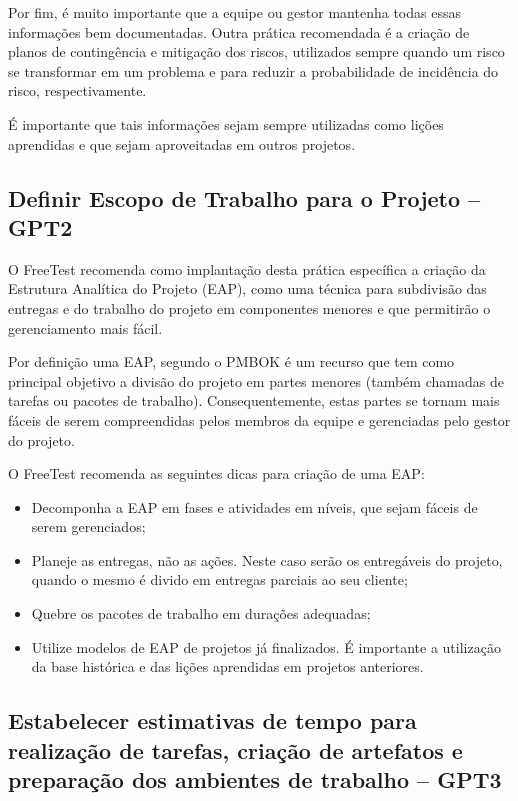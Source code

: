 Por fim, é muito importante que a equipe ou gestor mantenha todas essas informações bem documentadas. Outra prática recomendada é a criação de planos de contingência e mitigação dos riscos, utilizados sempre quando um risco se transformar em um problema e para reduzir a probabilidade de incidência do risco, respectivamente.

É importante que tais informações sejam sempre utilizadas como lições aprendidas e que sejam aproveitadas em outros projetos.

\subsection{Definir Escopo de Trabalho para o Projeto – GPT2}
\label{sec:guiagpt2}

O FreeTest recomenda como implantação desta prática específica a criação da Estrutura Analítica do Projeto (EAP), como uma técnica para subdivisão das entregas e do trabalho do projeto em componentes menores e que permitirão o gerenciamento mais fácil.

Por definição uma EAP, segundo o PMBOK \cite{GuiaPMBOK} é um recurso que tem como principal objetivo a divisão do projeto em partes menores (também chamadas de tarefas ou pacotes de trabalho). Consequentemente, estas partes se tornam mais fáceis de serem compreendidas pelos membros da equipe e gerenciadas pelo gestor do projeto.

O FreeTest recomenda as seguintes dicas para criação de uma EAP:

\begin{itemize}
	\item Decomponha a EAP em fases e atividades em níveis, que sejam fáceis de serem gerenciados;
	\item Planeje as entregas, não as ações. Neste caso serão os entregáveis do projeto, quando o mesmo é divido em entregas parciais ao seu cliente;
	\item Quebre os pacotes de trabalho em durações adequadas;
	\item Utilize modelos de EAP de projetos já finalizados. É importante a utilização da base histórica e das lições aprendidas em projetos anteriores.
\end{itemize}

\subsection{Estabelecer estimativas de tempo para realização de tarefas, criação de artefatos e preparação dos ambientes de trabalho – GPT3}
\label{sec:guiagpt3}

